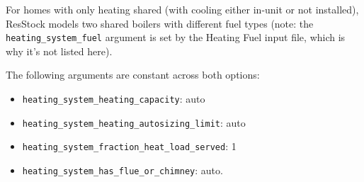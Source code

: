 
For homes with only heating shared (with cooling either in-unit or not installed), ResStock models two shared boilers with different fuel types (note: the \texttt{heating\_system\_fuel} argument is set by the Heating Fuel input file, which is why it's not listed here). 

The following arguments are constant across both options:
\begin{itemize}
    \item \texttt{heating\_system\_heating\_capacity}: auto
    \item \texttt{heating\_system\_heating\_autosizing\_limit}: auto
    \item \texttt{heating\_system\_fraction\_heat\_load\_served}: 1
    \item \texttt{heating\_system\_has\_flue\_or\_chimney}: auto.
\end{itemize}

